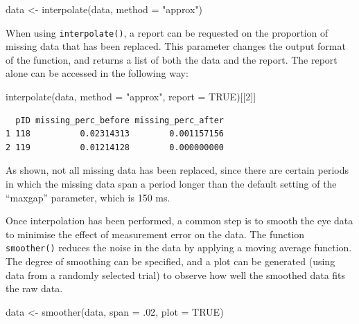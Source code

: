 \documentclass[
  man,
  floatsintext,
  longtable,
  nolmodern,
  notxfonts,
  notimes,
  colorlinks=true,linkcolor=blue,citecolor=blue,urlcolor=blue]{apa7}
\newenvironment{Shaded}{\begin{snugshade}}{\end{snugshade}}
\newcommand{\AttributeTok}[1]{\textcolor[rgb]{0.40,0.45,0.13}{#1}}
\newcommand{\ConstantTok}[1]{\textcolor[rgb]{0.56,0.35,0.01}{#1}}
\newcommand{\DecValTok}[1]{\textcolor[rgb]{0.68,0.00,0.00}{#1}}
\newcommand{\FunctionTok}[1]{\textcolor[rgb]{0.28,0.35,0.67}{#1}}
\newcommand{\NormalTok}[1]{\textcolor[rgb]{0.00,0.23,0.31}{#1}}
\newcommand{\OtherTok}[1]{\textcolor[rgb]{0.00,0.23,0.31}{#1}}
\newcommand{\StringTok}[1]{\textcolor[rgb]{0.13,0.47,0.30}{#1}}
\begin{document}
\begin{Shaded}
\begin{Highlighting}[]
\NormalTok{data }\OtherTok{\textless{}{-}} \FunctionTok{interpolate}\NormalTok{(data, }
                    \AttributeTok{method =} \StringTok{"approx"}\NormalTok{)}
\end{Highlighting}
\end{Shaded}

When using \texttt{interpolate()}, a report can be requested on the
proportion of missing data that has been replaced. This parameter
changes the output format of the function, and returns a list of both
the data and the report. The report alone can be accessed in the
following way:

\begin{Shaded}
\begin{Highlighting}[]
\FunctionTok{interpolate}\NormalTok{(data, }
            \AttributeTok{method =} \StringTok{"approx"}\NormalTok{, }
            \AttributeTok{report =} \ConstantTok{TRUE}\NormalTok{)[[}\DecValTok{2}\NormalTok{]]}
\end{Highlighting}
\end{Shaded}

\begin{verbatim}
  pID missing_perc_before missing_perc_after
1 118          0.02314313        0.001157156
2 119          0.01214128        0.000000000
\end{verbatim}

As shown, not all missing data has been replaced, since there are
certain periods in which the missing data span a period longer than the
default setting of the ``maxgap'' parameter, which is 150 ms.

Once interpolation has been performed, a common step is to smooth the
eye data to minimise the effect of measurement error on the data. The
function \texttt{smoother()} reduces the noise in the data by applying a
moving average function. The degree of smoothing can be specified, and a
plot can be generated (using data from a randomly selected trial) to
observe how well the smoothed data fits the raw data.

\begin{Shaded}
\begin{Highlighting}[]
\NormalTok{data }\OtherTok{\textless{}{-}} \FunctionTok{smoother}\NormalTok{(data,}
                 \AttributeTok{span =}\NormalTok{ .}\DecValTok{02}\NormalTok{,}
                 \AttributeTok{plot =} \ConstantTok{TRUE}\NormalTok{)}
\end{Highlighting}
\end{Shaded}
\end{document}
